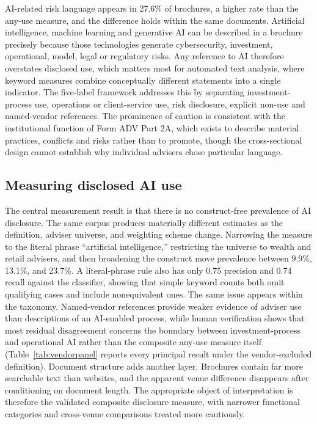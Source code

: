\documentclass[utf8]{FrontiersinHarvard}
\begin{document}
AI-related risk language appears in 27.6\% of brochures, a higher rate than the any-use measure, and the difference holds within the same documents. Artificial intelligence, machine learning and generative AI can be described in a brochure precisely because those technologies generate cybersecurity, investment, operational, model, legal or regulatory risks. Any reference to AI therefore overstates disclosed use, which matters most for automated text analysis, where keyword measures combine conceptually different statements into a single indicator. The five-label framework addresses this by separating investment-process use, operations or client-service use, risk disclosure, explicit non-use and named-vendor references. The prominence of caution is consistent with the institutional function of Form ADV Part 2A, which exists to describe material practices, conflicts and risks rather than to promote, though the cross-sectional design cannot establish why individual advisers chose particular language.

\subsection{Measuring disclosed AI use}

The central measurement result is that there is no construct-free prevalence of AI disclosure. The same corpus produces materially different estimates as the definition, adviser universe, and weighting scheme change. Narrowing the measure to the literal phrase ``artificial intelligence,'' restricting the universe to wealth and retail advisers, and then broadening the construct move prevalence between 9.9\%, 13.1\%, and 23.7\%. A literal-phrase rule also has only 0.75 precision and 0.74 recall against the classifier, showing that simple keyword counts both omit qualifying cases and include nonequivalent ones. The same issue appears within the taxonomy. Named-vendor references provide weaker evidence of adviser use than descriptions of an AI-enabled process, while human verification shows that most residual disagreement concerns the boundary between investment-process and operational AI rather than the composite any-use measure itself (Table~\ref{tab:vendorpanel} reports every principal result under the vendor-excluded definition). Document structure adds another layer. Brochures contain far more searchable text than websites, and the apparent venue difference disappears after conditioning on document length. The appropriate object of interpretation is therefore the validated composite disclosure measure, with narrower functional categories and cross-venue comparisons treated more cautiously.
\end{document}
